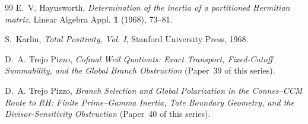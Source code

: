 \documentclass[11pt]{amsart}
\theoremstyle{definition}
\theoremstyle{remark}
\begin{document}
\begin{thebibliography}{99}
E.~V. Haynsworth,
\emph{Determination of the inertia of a partitioned Hermitian matrix},
Linear Algebra Appl. \textbf{1} (1968), 73--81.

S.~Karlin,
\emph{Total Positivity, Vol. I},
Stanford University Press, 1968.

D.~A. Trejo Pizzo,
\emph{Cofinal Weil Quotients: Exact Transport, Fixed-Cutoff Summability,
and the Global Branch Obstruction} (Paper~39 of this series).

D.~A. Trejo Pizzo,
\emph{Branch Selection and Global Polarization in the Connes--CCM Route to
RH: Finite Prime--Gamma Inertia, Tate Boundary Geometry, and the
Divisor-Sensitivity Obstruction} (Paper~40 of this series).

\end{thebibliography}
\end{document}
